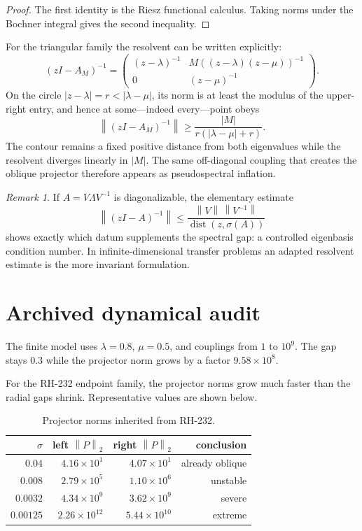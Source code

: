 \documentclass[11pt]{article}
\theoremstyle{remark}
\newtheorem{remark}[theorem]{Remark}
\newcommand{\norm}[1]{\left\lVert#1\right\rVert}
\begin{document}
\begin{proof}
The first identity is the Riesz functional calculus.  Taking norms under the
Bochner integral gives the second inequality.
\end{proof}

For the triangular family the resolvent can be written explicitly:
\[
 (zI-A_M)^{-1}
 =\begin{pmatrix}
 (z-\lambda)^{-1} & M((z-\lambda)(z-\mu))^{-1}\\
 0 & (z-\mu)^{-1}
 \end{pmatrix}.
\]
On the circle $|z-\lambda|=r<|\lambda-\mu|$, its norm is at least the
modulus of the upper-right entry, and hence at some---indeed every---point
obeys
\[
 \norm{(zI-A_M)^{-1}}
 \ge \frac{|M|}{r(|\lambda-\mu|+r)}.
\]
The contour remains a fixed positive distance from both eigenvalues while
the resolvent diverges linearly in $|M|$.  The same off-diagonal coupling that
creates the oblique projector therefore appears as pseudospectral inflation.

\begin{remark}
If $A=V\Lambda V^{-1}$ is diagonalizable, the elementary estimate
\[
 \norm{(zI-A)^{-1}}
 \le \frac{\norm V\,\norm{V^{-1}}}
          {\operatorname{dist}(z,\sigma(A))}
\]
shows exactly which datum supplements the spectral gap: a controlled
eigenbasis condition number.  In infinite-dimensional transfer problems an
adapted resolvent estimate is the more invariant formulation.
\end{remark}

\section{Archived dynamical audit}

The finite model uses $\lambda=0.8$, $\mu=0.5$, and couplings from $1$ to
$10^9$.  The gap stays $0.3$ while the projector norm grows by a factor
$9.58\times10^8$.

For the RH-232 endpoint family, the projector norms grow much faster than the
radial gaps shrink.  Representative values are shown below.

\begin{table}[ht]
\centering
\small
\begin{tabular}{rrrr}
\toprule
$\sigma$ & left $\norm P_2$ & right $\norm P_2$ & conclusion\\
\midrule
$0.04$ & $4.16\times10^1$ & $4.07\times10^1$ & already oblique\\
$0.008$ & $2.79\times10^5$ & $1.10\times10^6$ & unstable\\
$0.0032$ & $4.34\times10^9$ & $3.62\times10^9$ & severe\\
$0.00125$ & $2.26\times10^{12}$ & $5.44\times10^{10}$ & extreme\\
\bottomrule
\end{tabular}
\caption{Projector norms inherited from RH-232.}
\end{table}
\end{document}

